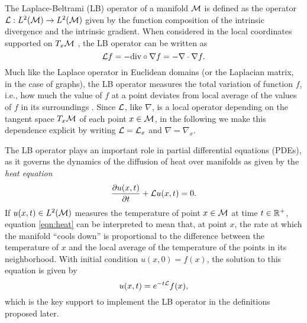 The Laplace-Beltrami (LB) operator of a manifold ${\mathcal M}$ is defined as the operator ${\mathcal L}: L^2({\mathcal M}) \to L^2({\mathcal M})$ given by the function composition of the intrinsic divergence and the intrinsic gradient. When considered in the local coordinates supported on $T_x{\mathcal M}$ \cite{canzani2013analysis}, the LB operator can be written as 
\begin{equation}\label{eqn:Laplacian}
    {\ensuremath{\mathcal L}} f=-\text{div}\circ \nabla f=-\nabla \cdot \nabla f.
\end{equation}
Much like the Laplace operator in Euclidean domains (or the Laplacian matrix, in the case of graphs\cite{moon2012field}), the LB operator measures the total variation of function $f$, i.e., how much the value of $f$ at a point deviates from local average of the values of $f$ in its surroundings \cite{bronstein2017geometric}. Since ${\mathcal L}$, like $\nabla$, is a local operator depending on the tangent space $T_x{\mathcal M}$ of each point $x \in {\ensuremath{\mathcal M}}$, in the following we make this dependence explicit by writing ${\mathcal L}={\mathcal L}_x$ and $\nabla=\nabla_x$.

The LB operator plays an important role in partial differential equations (PDEs), as it governs the dynamics of the diffusion of heat over manifolds as given by the \emph{heat equation}
%
\begin{equation}\label{eqn:heat}
    \frac{\partial u(x,t)}{\partial t}+{\mathcal L} u(x,t)=0 \text{.}
\end{equation}
%
If $u(x,t)\in L^2({\mathcal M})$ measures the temperature of point $x \in {\ensuremath{\mathcal M}}$ at time $t \in {\mathbb R}^{+}$, equation \eqref{eqn:heat} can be interpreted to mean that, at point $x$, the rate at which the manifold ``cools down'' is proportional to the difference between the temperature of $x$ and the local average of the temperature of the points in its neighborhood. With initial condition $u(x,0) = f(x)$, the solution to this equation is given by
\begin{equation}\label{eqn:heat-solution}
    u(x,t) = e^{-t {\mathcal L}}f(x) \text{,}
\end{equation}
which is the key support to implement the LB operator in the definitions proposed later.

